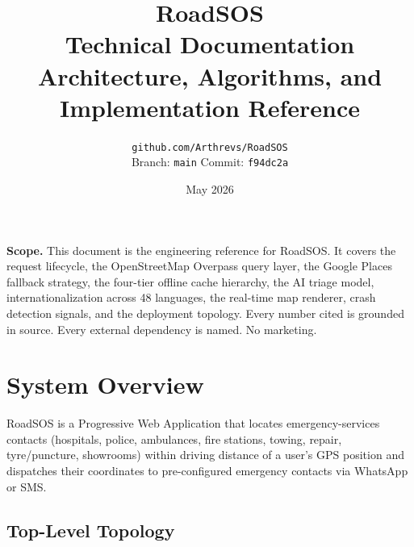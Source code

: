 \documentclass[11pt, a4paper]{article}
\title{
  \vspace{-1.5cm}
  \Huge\bfseries\color{rsnavy} RoadSOS \\
  \large\normalfont\color{rsgrey} Technical Documentation \\[0.4em]
  \normalsize\color{rsgrey} Architecture, Algorithms, and Implementation Reference
}
\author{
  \small\color{rsgrey} \texttt{github.com/Arthrevs/RoadSOS} \\
  \small\color{rsgrey} Branch: \texttt{main} \quad Commit: \texttt{f94dc2a}
}
\date{\small\color{rsgrey} May 2026}
\begin{document}
\maketitle
\thispagestyle{empty}
\vspace{0.5cm}

\begin{center}
\colorbox{rscode}{\parbox{0.85\textwidth}{\centering\small
\textbf{Scope.} This document is the engineering reference for RoadSOS. It covers the request lifecycle, the OpenStreetMap Overpass query layer, the Google Places fallback strategy, the four-tier offline cache hierarchy, the AI triage model, internationalization across 48 languages, the real-time map renderer, crash detection signals, and the deployment topology. Every number cited is grounded in source. Every external dependency is named. No marketing.
}}
\end{center}

\vspace{0.4cm}
{\small\tableofcontents}
\newpage

\section{System Overview}

RoadSOS is a Progressive Web Application that locates emergency-services contacts (hospitals, police, ambulances, fire stations, towing, repair, tyre/puncture, showrooms) within driving distance of a user's GPS position and dispatches their coordinates to pre-configured emergency contacts via WhatsApp or SMS.

\subsection{Top-Level Topology}
\end{document}
